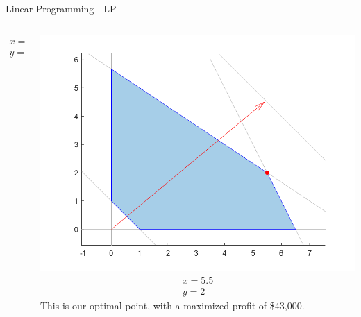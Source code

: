 \documentclass{beamer}
\begin{document}
\begin{frame}{Linear Programming - LP}
\begin{columns}[T]
\begin{column}{0.33\textwidth}
				\begin{align*}
				x = 6.5\\
				y = 0
				\end{align*}
			\end{column}
			\begin{column}{0.34\textwidth}
				\includegraphics[width=\textwidth]{images/slides_ex3_simplex3.png}
				\begin{align*}
				x = 5.5\\
				y = 2
				\end{align*}
				This is our optimal point, with a maximized profit of \$43,000.
			\end{column}
		\end{columns}
	\end{frame}
%	
\end{document}
